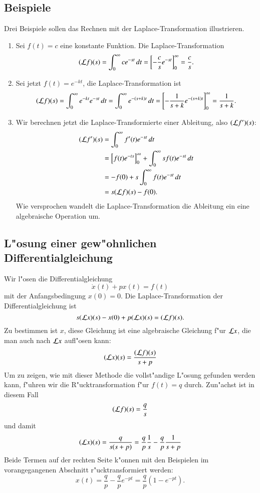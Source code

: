 \subsection{Beispiele}
Drei Beispiele sollen das Rechnen mit der Laplace-Transformation
illustrieren.
\begin{enumerate}
\item
Sei $f(t)=c$ eine konstante Funktion. Die Laplace-Transformation
\[
({\cal L}f)(s)
=
\int_0^\infty ce^{-st}\,dt
=
\left[
-\frac{c}{s}e^{-st}
\right]_0^\infty=\frac{c}{s}.
\]

\item
Sei jetzt $f(t)=e^{-kt}$, die Laplace-Transformation ist
\[
({\cal L}f)(s)=\int_0^\infty e^{-kt}e^{-st}\,dt
=\int_0^{\infty}e^{-(s+k)t}\,dt
=
\left[
- \frac1{s+k}e^{-(s+k)t}
\right]_0^\infty
=\frac1{s+k}.
\]

\item
Wir berechnen jetzt die Laplace-Transformierte einer Ableitung, also
$({\cal L}f')(s)$:
\begin{align*}
({\cal L}f')(s)
&=
\int_0^\infty f'(t)e^{-st}\,dt
\\
&=
\left[f(t)e^{-ts}\right]_0^\infty
+
\int_0^\infty sf(t)e^{-st}\,dt
\\
&=
-f(0)+s\int_0^\infty f(t)e^{-st}\,dt
\\
&=s({\cal L}f)(s)-f(0).
\end{align*}
Wie versprochen wandelt die Laplace-Transformation die Ableitung
ein eine algebraische Operation um.
\end{enumerate}

\subsection{L"osung einer gew"ohnlichen Differentialgleichung}
Wir l"osen die Differentialgleichung
\[
\dot x(t)+px(t)=f(t)
\]
mit der Anfangsbedingung $x(0)=0$.
Die Laplace-Transformation der Differentialgleichung ist
\[
s({\cal L}x)(s)-x(0)+p({\cal L}x)(s)=({\cal L}f)(s).
\]
Zu bestimmen ist $x$, diese Gleichung ist eine algebraische Gleichung
f"ur ${\cal L}x$, die man auch nach ${\cal L}x$ aufl"osen kann:
\[
({\cal L}x)(s)
=
\frac{({\cal L}f)(s)}{s+p}
\]
Um zu zeigen, wie mit dieser Methode die vollst"andige L"osung gefunden
werden kann, f"uhren wir die R"ucktransformation f"ur $f(t)=q$ durch.
Zun"achst ist in diesem Fall
\[
({\cal L}f)(s)=\frac{q}{s}
\]
und damit 
\[
({\cal L}x)(s)
=
\frac{q}{s(s+p)}=\frac{q}{p}\frac{1}{s}-\frac{q}{p}\frac{1}{s+p}
\]
Beide Termen auf der rechten Seite k"onnen mit den Beispielen im vorangegangenen
Abschnitt r"ucktransformiert werden:
\[
x(t)=\frac{q}{p}-\frac{q}{p}e^{-pt}=\frac{q}{p}(1-e^{-pt}).
\]

